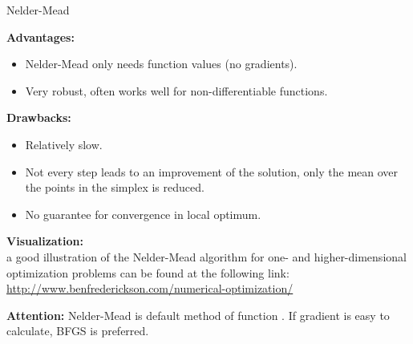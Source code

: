 \documentclass[11pt,compress,t,notes=noshow, xcolor=table]{beamer}
\begin{document}



\begin{vbframe}{Nelder-Mead}

\textbf{Advantages:}
\begin{itemize}
\item Nelder-Mead only needs function values (no gradients).
\item Very robust, often works well for non-differentiable functions.
\end{itemize}
\textbf{Drawbacks:}
\begin{itemize}
\item Relatively slow.
\item Not every step leads to an improvement of the solution, only the mean over the points in the simplex is reduced.
\item No guarantee for convergence in local optimum.
\end{itemize}

\textbf{Visualization:}\\
\small
a good illustration of the Nelder-Mead algorithm for one- and higher-dimensional optimization problems can be found at the following link: \url{http://www.benfrederickson.com/numerical-optimization/}

\vspace{0.3cm}
\textbf{Attention:} Nelder-Mead is default method of  function .
If gradient is easy to calculate, BFGS is preferred.

\end{vbframe}
\end{document}
